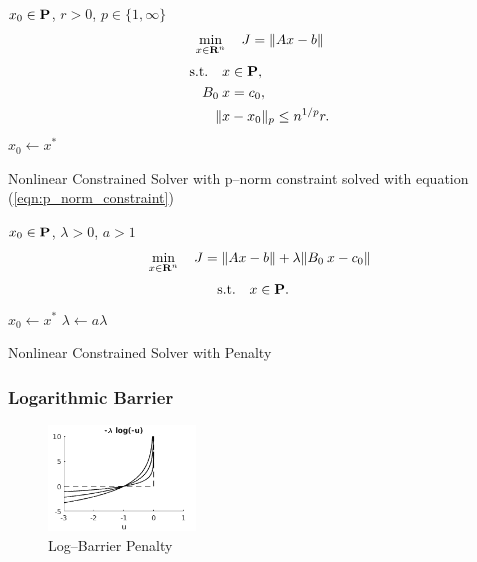 \documentclass{article}
\begin{document}
    \begin{algorithm}[H]
        \SetAlgoLined
        $x_0 \in\textbf{P}$, $r>0$, $p\in\{1,\infty\}$\\
        {
            \begin{align*}
                \min_{x\in\textbf{R}^n}\quad J = \|Ax-b\|
            \end{align*}
            \begin{align*}
                \text{s.t.} \quad &x\in\textbf{P},\\
                B_{0}\:&x=c_{0},\\
                \|&x-x_0\|_p\leq n^{1/p}r.
            \end{align*}
            $x_0\leftarrow x^*$
        }
    \caption{Nonlinear Constrained Solver with p--norm constraint 
    solved with equation (\ref{eqn:p_norm_constraint})}
    \label{algo:itc3}
    \end{algorithm} 

    \begin{algorithm}[H]
        \SetAlgoLined
        $x_0 \in\textbf{P}$, $\lambda>0$, $a>1$\\
        \While{$\lambda<\lambda^\circ$}
        {
            {
                \begin{align*}
                    \min_{x\in\textbf{R}^n}\quad J = \|Ax-b\|+\lambda\|B_{0}\:x-c_{0}\|
                \end{align*}
                \begin{align*}
                    \text{s.t.} \quad &x\in\textbf{P}.
                \end{align*}
                $x_0\leftarrow x^*$
            }
            $\lambda\leftarrow a \lambda$
        } 
    \caption{Nonlinear Constrained Solver with Penalty}
    \label{algo:itc2}
    \end{algorithm}



\clearpage

    \subsubsection{Logarithmic Barrier}
    \begin{figure}[h!]
        \centering
        \includegraphics[width=0.35\textwidth]{./figs/np/log_barrier.png}
        \caption{Log--Barrier Penalty}
        \label{fig:log_barrier}
    \end{figure}
\end{document}
